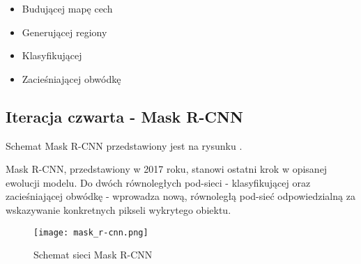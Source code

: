 \begin{itemize}
	\item Budującej mapę cech
	\item Generującej regiony
	\item Klasyfikującej
	\item Zacieśniającej obwódkę
\end{itemize}

\subsection{Iteracja czwarta - Mask R-CNN}

Schemat Mask R-CNN przedstawiony jest na rysunku .


Mask R-CNN, przedstawiony w 2017 roku, stanowi ostatni krok w opisanej ewolucji modelu.
Do dwóch równoległych pod-sieci - klasyfikującej oraz zacieśniającej obwódkę - wprowadza nową, równoległą pod-sieć odpowiedzialną za wskazywanie konkretnych pikseli wykrytego obiektu.

\begin{figure}[h]
  \centering
  \caption{Schemat sieci Mask R-CNN}
  \texttt{[image: mask\_r-cnn.png]}
  \label{fig:mask_r_cnn}
\end{figure}
